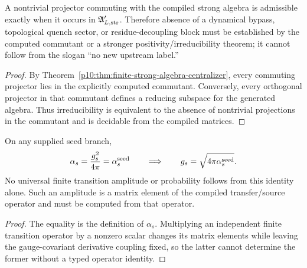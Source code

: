 \documentclass[12pt,a4paper]{article}
\providecommand{\alphasseed}{\alpha_s^{\rm seed}}
\begin{document}
\begin{corollary}
\label{p10:cor:no-hidden-dynamical-bypass-projector}
A nontrivial projector commuting with the compiled strong algebra is admissible exactly when it occurs in \(\mathfrak A'_{L,{\rm str}}\).  Therefore absence of a dynamical bypass, topological quench sector, or residue-decoupling block must be established by the computed commutant or a stronger positivity/irreducibility theorem; it cannot follow from the slogan ``no new upstream label.''
\end{corollary}
\begin{proof}
By Theorem~\ref{p10:thm:finite-strong-algebra-centralizer}, every commuting projector lies in the explicitly computed commutant.  Conversely, every orthogonal projector in that commutant defines a reducing subspace for the generated algebra.  Thus irreducibility is equivalent to the absence of nontrivial projections in the commutant and is decidable from the compiled matrices.
\end{proof}

\begin{theorem}
\label{p10:thm:quadratic-strong-seed-normalization}
On any supplied seed branch,
\begin{equation}
\alpha_s=\frac{g_s^2}{4\pi}=\alphasseed
\qquad\Longrightarrow\qquad
g_s=\sqrt{4\pi\alphasseed}.
\end{equation}
No universal finite transition amplitude or probability follows from this identity alone.  Such an amplitude is a matrix element of the compiled transfer/source operator and must be computed from that operator.
\end{theorem}
\begin{proof}
The equality is the definition of \(\alpha_s\).  Multiplying an independent finite transition operator by a nonzero scalar changes its matrix elements while leaving the gauge-covariant derivative coupling fixed, so the latter cannot determine the former without a typed operator identity.
\end{proof}
\end{document}
